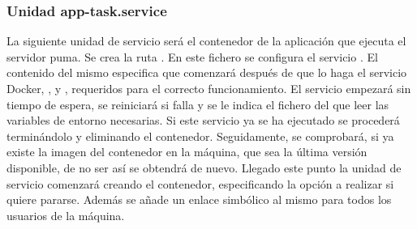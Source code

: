 \subsubsection{Unidad app-task.service}

La siguiente unidad de servicio será el contenedor de la aplicación que ejecuta el servidor puma. Se crea la ruta . En este fichero se configura el servicio . El contenido del mismo especifica que comenzará después de que lo haga el servicio Docker, ,  y , requeridos para el correcto funcionamiento. El servicio empezará  sin tiempo de espera, se reiniciará si falla y se le indica el fichero del que leer las variables de entorno necesarias. Si este servicio ya se ha ejecutado se procederá terminándolo y eliminando el contenedor. Seguidamente, se comprobará, si ya existe la imagen del contenedor en la máquina, que sea la última versión disponible, de no ser así se obtendrá de nuevo. Llegado este punto la unidad de servicio comenzará creando el contenedor, especificando la opción a realizar si quiere pararse. Además se añade un enlace simbólico al mismo para todos los usuarios de la máquina. 

